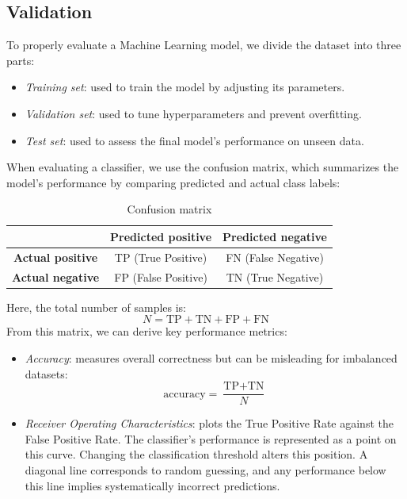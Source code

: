 \subsection{Validation}
To properly evaluate a Machine Learning model, we divide the dataset into three parts: 
\begin{itemize}
    \item \textit{Training set}: used to train the model by adjusting its parameters.
    \item \textit{Validation set}: used to tune hyperparameters and prevent overfitting.
    \item \textit{Test set}: used to assess the final model's performance on unseen data.
\end{itemize}
\noindent When evaluating a classifier, we use the confusion matrix, which summarizes the model's performance by comparing predicted and actual class labels:
\renewcommand{\arraystretch}{1.5}
\begin{table}[h]
    \centering
    \begin{tabular}{|c|cc|}
        \hline
         & \textbf{Predicted positive} & \textbf{Predicted negative} \\
        \hline
        \textbf{Actual positive} & TP (True Positive) & FN (False Negative) \\
        \textbf{Actual negative} & FP (False Positive) & TN (True Negative) \\ 
        \hline
    \end{tabular}
    \caption{Confusion matrix}
\end{table}
\renewcommand{\arraystretch}{1}

\noindent Here, the total number of samples is:
\[N=\text{TP}+\text{TN}+\text{FP}+\text{FN}\]
\noindent From this matrix, we can derive key performance metrics:

\begin{itemize}
    \item \textit{Accuracy}: measures overall correctness but can be misleading for imbalanced datasets: 
        \[\text{accuracy}=\dfrac{\text{TP}+\text{TN}}{N}\]
    \item \textit{Receiver Operating Characteristics}: plots the True Positive Rate against the False Positive Rate. 
        The classifier's performance is represented as a point on this curve. 
        Changing the classification threshold alters this position. 
        A diagonal line corresponds to random guessing, and any performance below this line implies systematically incorrect predictions.  
\end{itemize}

